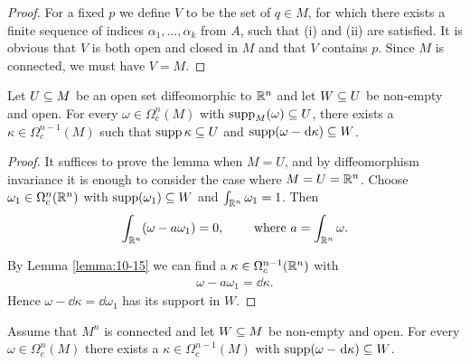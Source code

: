 \begin{proof}
  For a fixed $p$ we define $V$ to be the set of $q\in M$, for which there exists
a finite sequence of indices $\alpha_1, \ldots, \alpha_k$ from $A$, such that (i) and (ii) are 
satisfied. It is obvious that $V$ is both open and closed in $M$ and that $V$ contains $p$. Since
$M$ is connected, we must have $V = M$.
\end{proof}

\begin{lemma}\label{lemma:10-17}
  Let $U\subseteq M$ be an open set diffeomorphic to ${\mathbb{R}}^n$ and let $W\subseteq U$ be 
  non-empty and open. For every $\omega\in\Omega^n_c(M)$ with $\operatorname{supp}_M(\omega)\subseteq U$, there 
  exists a $\kappa\in\Omega^{n-1}_c(M)$ such that $\operatorname{supp}\kappa\subseteq U$ and $\supp(\omega-\dd\kappa)\sseq W$.
\end{lemma}

\begin{proof}
  It suffices to prove the lemma when $M = U$, and by diffeomorphism
invariance it is enough to consider the case where $M = U = {\mathbb{R}}^n$. Choose $\omega_1\in\Omega_c^n({\mathbb{R}}^n)$
with $\operatorname{supp}(\omega_1)\subseteq W$ and $\int_{{\mathbb{R}}^n}\omega_1 = 1$. Then 
\begin{align*}
  \int_{{\mathbb{R}}^n} (\omega -a\omega_1) = 0, \qquad \text{ where } a = \int_{{\mathbb{R}}^n}\omega.
\end{align*}

By Lemma \ref{lemma:10-15} we can find a $\kappa\in\Omega^{n-1}_c({\mathbb{R}}^n)$ with 
\begin{align*}
  \omega - a\omega_1 = \dd\kappa.
\end{align*}
Hence $\omega - \dd\kappa = \dd\omega_1$ has its support in $W$.
\end{proof}

\begin{lemma}\label{lemma:10-18}
  Assume that $M^n$ is connected and let $W\subseteq M$ be non-empty and 
  open. For every $\omega\in\Omega^n_c(M)$ there exists a $\kappa\in\Omega^{n-1}_c(M)$ with 
  $\supp(\omega-\dd\kappa)\sseq W$.
\end{lemma}

